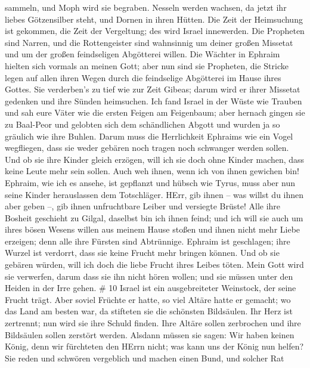 sammeln, und Moph wird sie begraben. Nesseln werden wachsen, da jetzt
ihr liebes Götzensilber steht, und Dornen in ihren Hütten. 
Die Zeit der Heimsuchung ist gekommen, die Zeit der Vergeltung; des wird
Israel innewerden. Die Propheten sind Narren, und die Rottengeister sind
wahnsinnig um deiner großen Missetat und um der großen feindseligen
Abgötterei willen.  Die Wächter in Ephraim hielten sich
vormals an meinen Gott; aber nun sind sie Propheten, die Stricke legen
auf allen ihren Wegen durch die feindselige Abgötterei im Hause ihres
Gottes.  Sie verderben's zu tief wie zur Zeit Gibeas; darum
wird er ihrer Missetat gedenken und ihre Sünden heimsuchen.
 Ich fand Israel in der Wüste wie Trauben und sah eure
Väter wie die ersten Feigen am Feigenbaum; aber hernach gingen sie zu
Baal-Peor und gelobten sich dem schändlichen Abgott und wurden ja so
gräulich wie ihre Buhlen.  Darum muss die Herrlichkeit
Ephraims wie ein Vogel wegfliegen, dass sie weder gebären noch tragen
noch schwanger werden sollen.  Und ob sie ihre Kinder
gleich erzögen, will ich sie doch ohne Kinder machen, dass keine Leute
mehr sein sollen. Auch weh ihnen, wenn ich von ihnen gewichen bin!
 Ephraim, wie ich es ansehe, ist gepflanzt und hübsch wie
Tyrus, muss aber nun seine Kinder herauslassen dem Totschläger.
 HErr, gib ihnen -- was willst du ihnen aber geben --, gib
ihnen unfruchtbare Leiber und versiegte Brüste!  Alle ihre
Bosheit geschieht zu Gilgal, daselbst bin ich ihnen feind; und ich will
sie auch um ihres bösen Wesens willen aus meinem Hause stoßen und ihnen
nicht mehr Liebe erzeigen; denn alle ihre Fürsten sind Abtrünnige.
 Ephraim ist geschlagen; ihre Wurzel ist verdorrt, dass sie
keine Frucht mehr bringen können. Und ob sie gebären würden, will ich
doch die liebe Frucht ihres Leibes töten.  Mein Gott wird
sie verwerfen, darum dass sie ihn nicht hören wollen; und sie müssen
unter den Heiden in der Irre gehen. \# 10  Israel ist ein
ausgebreiteter Weinstock, der seine Frucht trägt. Aber soviel Früchte er
hatte, so viel Altäre hatte er gemacht; wo das Land am besten war, da
stifteten sie die schönsten Bildsäulen.  Ihr Herz ist
zertrennt; nun wird sie ihre Schuld finden. Ihre Altäre sollen
zerbrochen und ihre Bildsäulen sollen zerstört werden. 
Alsdann müssen sie sagen: Wir haben keinen König, denn wir fürchteten
den HErrn nicht; was kann uns der König nun helfen?  Sie
reden und schwören vergeblich und machen einen Bund, und solcher Rat
